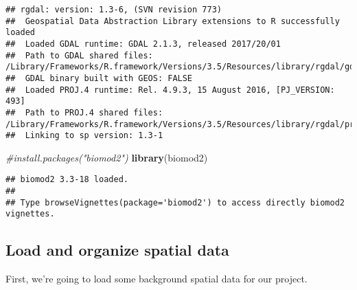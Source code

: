 \documentclass[]{article}
\newenvironment{Shaded}{\begin{snugshade}}{\end{snugshade}}
\newcommand{\KeywordTok}[1]{\textcolor[rgb]{0.13,0.29,0.53}{\textbf{#1}}}
\newcommand{\DataTypeTok}[1]{\textcolor[rgb]{0.13,0.29,0.53}{#1}}
\newcommand{\StringTok}[1]{\textcolor[rgb]{0.31,0.60,0.02}{#1}}
\newcommand{\CommentTok}[1]{\textcolor[rgb]{0.56,0.35,0.01}{\textit{#1}}}
\newcommand{\OtherTok}[1]{\textcolor[rgb]{0.56,0.35,0.01}{#1}}
\newcommand{\OperatorTok}[1]{\textcolor[rgb]{0.81,0.36,0.00}{\textbf{#1}}}
\newcommand{\NormalTok}[1]{#1}
\begin{document}
\begin{verbatim}
## rgdal: version: 1.3-6, (SVN revision 773)
##  Geospatial Data Abstraction Library extensions to R successfully loaded
##  Loaded GDAL runtime: GDAL 2.1.3, released 2017/20/01
##  Path to GDAL shared files: /Library/Frameworks/R.framework/Versions/3.5/Resources/library/rgdal/gdal
##  GDAL binary built with GEOS: FALSE 
##  Loaded PROJ.4 runtime: Rel. 4.9.3, 15 August 2016, [PJ_VERSION: 493]
##  Path to PROJ.4 shared files: /Library/Frameworks/R.framework/Versions/3.5/Resources/library/rgdal/proj
##  Linking to sp version: 1.3-1
\end{verbatim}

\begin{Shaded}
\begin{Highlighting}[]
  \CommentTok{#install.packages("biomod2")}
    \KeywordTok{library}\NormalTok{(biomod2)}
\end{Highlighting}
\end{Shaded}

\begin{verbatim}
## biomod2 3.3-18 loaded.
## 
## Type browseVignettes(package='biomod2') to access directly biomod2 vignettes.
\end{verbatim}

\begin{Shaded}
\end{Shaded}

\subsection{Load and organize spatial
data}\label{load-and-organize-spatial-data}

First, we're going to load some background spatial data for our project.
\end{document}
